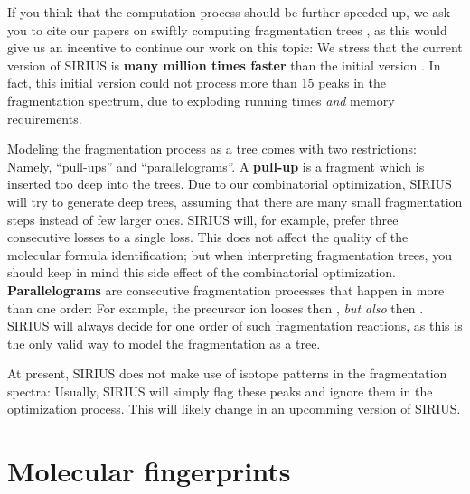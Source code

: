 \documentclass[letterpaper,10pt,openany,oneside]{sphinxmanual}
\begin{document}
If you think that the computation process should be further speeded up, we
ask you to cite our papers on swiftly computing fragmentation trees
\citep{white15speedy, rauf13finding}, as this would give us an incentive to
continue our work on this topic: We stress that the current version of
SIRIUS is \textbf{many million times faster} than the initial version
\citep{boecker08towards}.  In fact, this initial version could not process
more than 15 peaks in the fragmentation spectrum, due to exploding running
times \emph{and} memory requirements.

Modeling the fragmentation process as a tree comes with two restrictions:
Namely, ``pull-ups'' and ``parallelograms''.  A \textbf{pull-up} is a
fragment which is inserted too deep into the trees.  Due to our combinatorial
optimization, SIRIUS will try to generate deep trees, assuming that there
are many small fragmentation steps instead of few larger ones.  SIRIUS
will, for example, prefer three consecutive  losses to a
single  loss.  This does not affect the quality of the molecular
formula identification; but when interpreting fragmentation trees, you should
keep in mind this side effect of the combinatorial
optimization.  \textbf{Parallelograms} are consecutive fragmentation
processes that happen in more than one order: For example, the precursor ion
looses  then , \emph{but also}  then .
SIRIUS will always decide for one order of such fragmentation reactions, as
this is the only valid way to model the fragmentation as a tree.

At present, SIRIUS does not make use of isotope patterns in the
fragmentation spectra: Usually, SIRIUS will simply flag these peaks and
ignore them in the optimization process.  This will likely change in an
upcomming version of SIRIUS.


\section{Molecular fingerprints}
\end{document}
